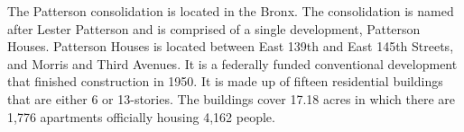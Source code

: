

The Patterson consolidation is located in the Bronx. The consolidation is named after Lester Patterson and is comprised of a single development, Patterson Houses. Patterson Houses is located between East 139th and East 145th Streets, and Morris and Third Avenues. It is a federally funded conventional development that finished construction in 1950. It is made up of fifteen residential buildings that are either 6 or 13-stories. The buildings cover 17.18 acres in which there are 1,776 apartments officially housing 4,162 people.